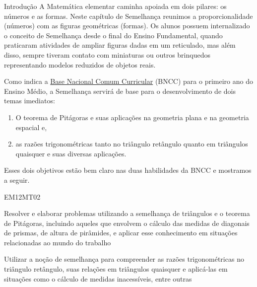 \mainmatter

\begin{apresentacao}{Introdução}
A Matemática elementar caminha apoiada em dois pilares: os números e as formas. Neste capítulo de Semelhança reunimos a proporcionalidade (números) com as figuras geométricas (formas). Os alunos possuem internalizado o conceito de Semelhança desde o final do Ensino Fundamental, quando praticaram atividades de ampliar figuras dadas em um reticulado, mas além disso, sempre tiveram contato com miniaturas ou outros brinquedos representando modelos reduzidos de objetos reais.

Como indica a \href{http://historiadabncc.mec.gov.br/documentos/bncc-2versao.revista.pdf}{Base Nacional Comum Curricular}  (BNCC) para o primeiro ano do Ensino Médio, a Semelhança servirá de base para o desenvolvimento de dois temas imediatos:
\begin{enumerate}
\item {} 
O teorema de Pitágoras e suas aplicações na geometria plana e na geometria espacial e,

\item {} 
as razões trigonométricas tanto no triângulo retângulo quanto em triângulos quaisquer e suas diversas aplicações.

\end{enumerate}

Esses dois objetivos estão bem claro nas duas habilidades da BNCC e mostramos a seguir.

\begin{habilities}{EM12MT02}

Resolver e elaborar problemas utilizando a semelhança de triângulos e o teorema de Pitágoras, incluindo aqueles que envolvem o cálculo das medidas de diagonais de prismas, de altura de pirâmides, e aplicar esse conhecimento em situações relacionadas ao mundo do trabalho


Utilizar a noção de semelhança para compreender as razões trigonométricas no triângulo retângulo, suas relações em triângulos quaisquer e aplicá-las em situações como o cálculo de medidas inacessíveis, entre outras
\end{habilities}


\end{apresentacao}
